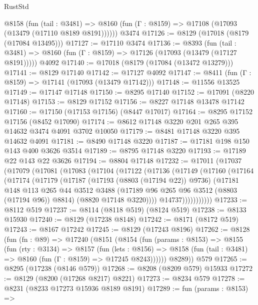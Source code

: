 \begin{lexlean}{RustStd}
\begin{coremodule}
    @8158
      (fun (tail : @3481) =>
      @8160 (fun (Γ : @8159) => @17108 (@17093 (@13479 (@17110 @8189 @8191))))))
    @3474
@17126 := @8129 (@17018 (@8179 (@17084 @13495)))
@17127 := @17110 @3474
@17136 := @8393
    (fun (tail : @3481) => @8160 (fun (Γ : @8159) => @17126 (@17093 (@13479 (@17127 @8191)))))
    @4092
@17140 := @17018 (@8179 (@17084 (@13472 @13279)))
@17141 := @8129 @17140
@17142 := @17127 @4092
@17147 := @8411 (fun (Γ : @8159) => @17141 (@17093 (@13479 @17142)))
@17148 := @11556 @13525
@17149 := @17147 @17148
@17150 := @8295 @17140
@17152 := @17091 (@8220 @17148)
@17153 := @8129 @17152
@17156 := @8227 @17148 @13478 @17142
@17160 := @17150 (@17153 @17156) (@8447 @17017)
@17164 := @8295 @17152 @17156 (@8452 @17090)
@17174 := @8612 @17148 @3220 @201 @265 @395 @14632 @3474 @4091 @3702 @10050
@17179 := @8481 @17148 @3220 @395 @14632 @4091
@17181 := @8490 @17148 @3220
@17187 := @17181 @198 @150 @143 @400 @3626 @3514
@17189 := @8795 @17148 @3220
@17193 := @17189 @22 @143 @22 @3626
@17194 := @8804 @17148
@17232 := @17011
    (@17037
      (@17079
        (@17081
          (@17083
            (@17104
              (@17122
                (@17136
                  (@17149
                    (@17160
                      (@17164
                        (@17174
                          (@17179
                            (@17187
                              (@17193 (@8803 (@17194 @22)) @9736)
                              (@17181
                                @148
                                @113
                                @265
                                @44
                                @3512
                                @3488
                                (@17189 @96 @265 @96 @3512 (@8803 (@17194 @96)) @8814)
                                (@8820 @17148 @3220))))
                          @14737)))))))))))
@17233 := @8112 @519
@17237 := @8114 (@8118 @519) (@8124 @519)
@17238 := @8133 @15930
@17240 := @8129 (@17238 @8148)
@17242 := @8171 (@8172 @519)
@17243 := @8167 @17242
@17245 := @8129 (@17243 @8196)
@17262 := @8128
    (fun (fn : @89) =>
    @17240
      (@8151
        (@8154
          (fun (params : @8153) =>
          @8155
            (fun (rty : @3134) =>
            @8157
              (fun (lets : @8156) =>
              @8158 (fun (tail : @3481) => @8160 (fun (Γ : @8159) => @17245 @8243))))))
        @8289))
    @579
@17265 := @8295 (@17238 (@8146 @579))
@17268 := @8208 (@8209 @579) @15933
@17272 := @8129 (@8200 (@17268 @8217) @8221)
@17273 := @8234 @579
@17278 := @8231 (@8233 @17273 @15936 @8189 @8191)
@17289 := fun (params : @8153) =>

\end{coremodule}
\end{lexlean}
